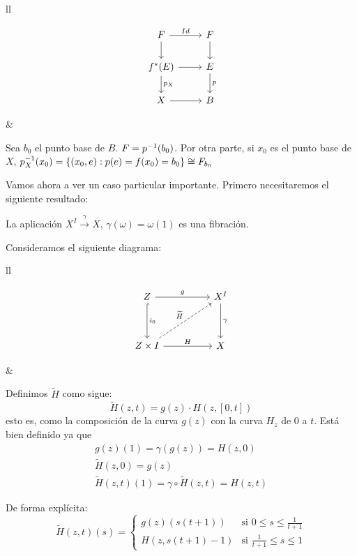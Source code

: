 \begin{tabular}{ll}
\begin{minipage}{0.3\textwidth}
\[
\begin{tikzcd}
F \rar{Id} \dar & F \dar \\
f^*(E) \rar \dar{p_X}  & E \dar{p} \\
X \rar & B
\end{tikzcd}
\]
\end{minipage}
&
\begin{minipage}{0.65\textwidth}
\begin{demo}
Sea $b_0$ el punto base de $B$. $F = \nobreak p^{-1}(b_0)$. Por otra parte, si $x_0$ es el punto base de $X$, $p_X^{-1}(x_0) = \nobreak \{ (x_0, e) : p(e) = f(x_0) = b_0\} \cong F_{b_0}$
\end{demo}
\end{minipage}
\end{tabular}
Vamos ahora a ver un caso particular importante. Primero necesitaremos el siguiente resultado:
\begin{prop}
La aplicación $X^I \stackrel{\gamma}{\longrightarrow} X$, $\gamma(\omega) = \omega(1)$ es una fibración.
\end{prop}
\begin{demo}
Consideramos el siguiente diagrama:\par
\begin{tabular}{ll}
\begin{minipage}{0.3\textwidth}
\[
\begin{tikzcd}
Z \arrow{rr}{g} \arrow[hook]{dd}{i_0} & & X^I \arrow{dd}{\gamma} \\
\\
Z \times I \arrow{rr}{H} \arrow[dashed]{uurr}{\widetilde{H}} & & X
\end{tikzcd}
\]
\end{minipage}
&
\begin{minipage}{0.65\textwidth}
Definimos $\widetilde{H}$ como sigue:
\[ \widetilde{H}(z,t) = g(z) \cdotp H(z, [0,t]) \]
esto es, como la composición de la curva $g(z)$ con la curva $H_z$ de $0$ a $t$. Está bien definido ya que
\begin{align*}
g(z)(1) = \gamma(g(z)) = H(z,0)\\
\widetilde{H}(z,0) = g(z) \\
\widetilde{H}(z,t)(1) = \gamma \circ \widetilde{H}(z,t) = H(z,t) \end{align*}
\end{minipage}
\end{tabular}
De forma explícita:
\[
\widetilde{H}(z,t)(s) = 
\begin{cases}
g(z)(s(t+1)) & \text{si } 0 \leq s \leq \frac{1}{t+1} \\
H(z, s(t+1) -1) & \text{si } \frac{1}{t+1} \leq s \leq 1
\end{cases}
\]
\end{demo}
